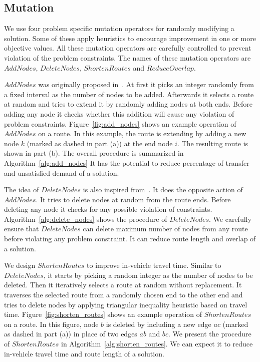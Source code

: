 \subsection{Mutation}
We use four problem specific mutation operators for randomly modifying a solution. Some of these apply heuristics to encourage improvement in one or more objective values. All these mutation operators are carefully controlled to prevent violation of the problem constraints. The names of these mutation operators are $AddNodes$, $DeleteNodes$, $ShortenRoutes$ and $ReduceOverlap$.

$AddNodes$ was originally proposed in~\cite{mumford2013new}. At first it picks an integer randomly from a fixed interval as the number of nodes to be added. Afterwards it selects a route at random and tries to extend it by randomly adding nodes at both ends. Before adding any node it checks whether this addition will cause any violation of problem constraints. Figure~\ref{fig:add_nodes} shows an example operation of $AddNodes$ on a route. In this example, the route is extending by adding a new node $k$ (marked as dashed in part (a)) at the end node $i$. The resulting route is shown in part (b). The overall procedure is summarized in Algorithm~\ref{alg:add_nodes} It has the potential to reduce percentage of transfer and unsatisfied demand of a solution.

The idea of $DeleteNodes$ is also inspired from~\cite{mumford2013new}. It does the opposite action of $AddNodes$. It tries to delete nodes at random from the route ends. Before deleting any node it checks for any possible violation of constraints. Algorithm~\ref{alg:delete_nodes} shows the procedure of $DeleteNodes$. We carefully ensure that $DeleteNodes$ can delete maximum number of nodes from any route before violating any problem constraint. It can reduce route length and overlap of a solution.

We design $ShortenRoutes$ to improve in-vehicle travel time. Similar to $DeleteNodes$, it starts by picking a random integer as the number of nodes to be deleted. Then it iteratively selects a route at random without replacement. It traverses the selected route from a randomly chosen end to the other end and tries to delete nodes by applying triangular inequality heuristic based on travel time. Figure~\ref{fig:shorten_routes} shows an example operation of $ShortenRoutes$ on a route. In this figure, node $b$ is deleted by including a new edge $ac$ (marked as dashed in part (a)) in place of two edges $ab$ and $bc$. We present the procedure of $ShortenRoutes$ in Algorithm~\ref{alg:shorten_routes}. We can expect it to reduce in-vehicle travel time and route length of a solution.

